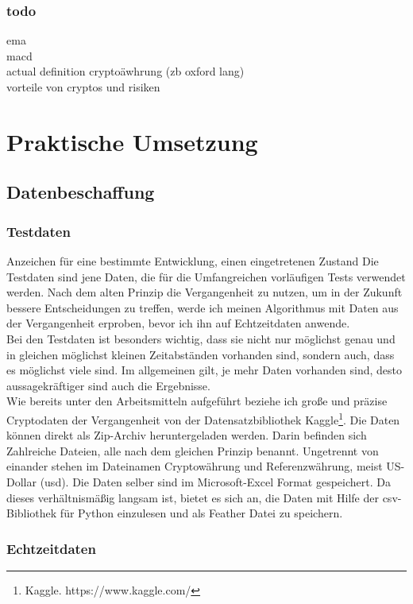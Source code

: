 \documentclass[12pt]{article}
\begin{document}
	\subsubsection{todo}
		ema \\
		macd\\
		actual definition cryptoäwhrung (zb oxford lang)\\
		vorteile von cryptos und risiken

\section{Praktische Umsetzung}
\subsection{Datenbeschaffung}
	\subsubsection{Testdaten}Anzeichen für eine bestimmte Entwicklung, einen eingetretenen Zustand
		Die Testdaten sind jene Daten, die für die Umfangreichen vorläufigen Tests verwendet werden. Nach dem alten Prinzip die Vergangenheit zu nutzen, um in der Zukunft bessere Entscheidungen zu treffen, werde ich meinen Algorithmus mit Daten aus der Vergangenheit erproben, bevor ich ihn auf Echtzeitdaten anwende.\\
		Bei den Testdaten ist besonders wichtig, dass sie nicht nur möglichst genau und in gleichen möglichst kleinen Zeitabständen vorhanden sind, sondern auch, dass es möglichst viele sind. Im allgemeinen gilt, je mehr Daten vorhanden sind, desto aussagekräftiger sind auch die Ergebnisse.\\
		Wie bereits unter den Arbeitsmitteln aufgeführt beziehe ich große und präzise Cryptodaten der Vergangenheit von der Datensatzbibliothek Kaggle\footnote{Kaggle. https://www.kaggle.com/}. Die Daten können direkt als Zip-Archiv heruntergeladen werden. Darin befinden sich Zahlreiche Dateien, alle nach dem gleichen Prinzip benannt. Ungetrennt von einander stehen im Dateinamen Cryptowährung und Referenzwährung, meist US-Dollar (usd). Die Daten selber sind im Microsoft-Excel Format gespeichert. Da dieses verhältnismäßig langsam ist, bietet es sich an, die Daten mit Hilfe der csv-Bibliothek für Python einzulesen und als Feather Datei zu speichern. 
	\subsubsection{Echtzeitdaten}
\end{document}
